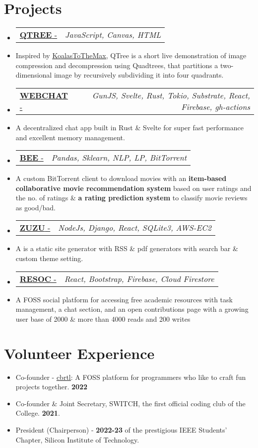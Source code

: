 \documentclass[letterpaper,11pt]{article}
\makeatletter
\newcommand{\resumeItem}[1]{
  \item\small{
    {#1 \vspace{-2pt}}
  }
}
\newcommand{\resumeProjectHeading}[2]{
    \item
    \begin{tabular*}{0.97\textwidth}{l@{\extracolsep{\fill}}r}
      \small#1 & \textit{\small #2} \\
    \end{tabular*}\vspace{-1 pt}
}
\newcommand{\resumeSubItem}[1]{\resumeItem{#1}\vspace{-4pt}}
\newcommand{\resumeSubHeadingListStart}{\begin{itemize}[leftmargin=0.15in, label={}]}
\newcommand{\resumeSubHeadingListEnd}{\end{itemize}}
\makeatother
\begin{document}
\section{Projects}
  \resumeSubHeadingListStart
  \resumeProjectHeading
    {\href{https://anubhavp.dev/blog/qtree.html}{\textbf{QTREE} - \faIcon{link}}}{JavaScript, Canvas, HTML}
    \resumeSubItem
      {Inspired by {\href{https://github.com/vogievetsky/KoalasToTheMax}{ \underline{KoalasToTheMax}}}, QTree is a short live demonstration of image compression and decompression using Quadtrees, that partitions a two-dimensional image by recursively subdividing it into four quadrants. }
    \resumeProjectHeading
    {\href{https://github.com/fuzzymfx/w3bchat-dapp}{\textbf{WEBCHAT} - \faIcon{link}}}{GunJS, Svelte, Rust, Tokio, Substrate, React, Firebase, gh-actions}
    \resumeSubItem
      {A decentralized chat app built in Rust \& Svelte for super fast performance and excellent memory management. }
      \resumeProjectHeading
    {\href{https://github.com/fuzzymfx/bee}{{\textbf{BEE} - \faIcon{link} }}}{Pandas, Sklearn, NLP, LP, BitTorrent}
    \resumeSubItem
      {A custom BitTorrent client to download movies with an \textbf{item-based collaborative movie recommendation system} based on user ratings and the no. of ratings \& \textbf{a rating prediction system} to classify movie reviews as good/bad.}
      \resumeProjectHeading
    {\href{https://github.com/fuzzymfx/zuzu}{\textbf{ZUZU} - \faIcon{link}}}{NodeJs, Django, React, SQLite3, AWS-EC2}
    \resumeSubItem
      {A is a static site generator with RSS \& pdf generators with search bar \& custom theme setting.}
      \resumeProjectHeading
    {\href{https://github.com/fuzzymfx/resoc}{\textbf{RESOC} - \faIcon{link} }}{React, Bootstrap, Firebase, Cloud Firestore}
    \resumeSubItem
      {A FOSS social platform for accessing free academic resources with task management, a chat section, and an open contributions page with a growing user base of 2000 \& more than 4000 reads and 200 writes}
  \resumeSubHeadingListEnd

%

\section{Volunteer Experience}
  \resumeSubHeadingListStart
    \resumeSubItem
      {Co-founder - \underline{\href{https://cbrtl.github.io}{cbrtl}}: A FOSS platform for programmers who like to craft fun projects together. \textbf{2022}\\}
    \resumeSubItem
      {Co-founder \& Joint Secretary, SWITCH, the first official coding club of the College. \textbf{2021}.\\}
    \resumeSubItem
      {President (Chairperson) - \textbf{2022-23} of the prestigious IEEE Students’ Chapter, Silicon Institute of Technology.\\}
  \resumeSubHeadingListEnd
\end{document}
